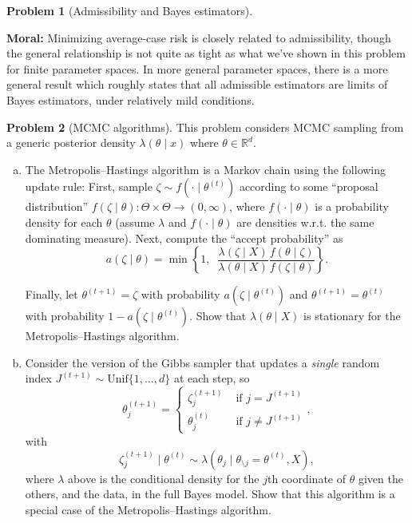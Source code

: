 \documentclass{article}
\newcommand{\RR}{\mathbb{R}}
\theoremstyle{definition}
\newtheorem{problem}{Problem}
\begin{document}
\begin{problem}[Admissibility and Bayes estimators]
\begin{enumerate}[(a)]
\end{enumerate}

{\bf Moral:} Minimizing average-case risk is closely related to admissibility, though the general relationship is not quite as tight as what we've shown in this problem for finite parameter spaces. In more general parameter spaces, there is a more general result which roughly states that all admissible estimators are limits of Bayes estimators, under relatively mild conditions.
\end{problem}


\begin{problem}[MCMC algorithms]
This problem considers MCMC sampling from a generic posterior density $\lambda(\theta \mid x)$ where $\theta\in\RR^d$.

\begin{enumerate}[(a)]

\item The Metropolis--Hastings algorithm is a Markov chain using the following update rule: First, sample $\zeta \sim f(\cdot \mid \theta^{(t)})$ according to some ``proposal distribution'' $f(\zeta\mid\theta): \Theta \times \Theta \to (0,\infty)$, where $f(\cdot \mid \theta)$ is a probability density for each $\theta$ (assume $\lambda$ and $f(\cdot \mid \theta)$ are densities w.r.t. the same dominating measure). Next, compute the ``accept probability'' as 
\[
a(\zeta \mid \theta) = \min \left\{1, \;\;\frac{\lambda(\zeta \mid X)}{\lambda(\theta \mid X) } \frac{f(\theta \mid \zeta)}{f(\zeta \mid \theta)}\right\}.
\]

Finally, let $\theta^{(t+1)} = \zeta$ with probability $a(\zeta \mid \theta^{(t)})$ and $\theta^{(t+1)} = \theta^{(t)}$ with probability $1-a(\zeta \mid \theta^{(t)})$. Show that $\lambda(\theta\mid X)$ is stationary for the Metropolis--Hastings algorithm.




\item Consider the version of the Gibbs sampler that updates a {\em single} random index $J^{(t+1)} \sim \text{Unif}\{1,\ldots,d\}$ at each step, so
\[
\theta_j^{(t+1)} = \begin{cases} \zeta_j^{(t+1)} &\text{ if } j = J^{(t+1)} \\ \theta_j^{(t)} &\text{ if } j \neq J^{(t+1)}\end{cases},
\]
with
\[
\zeta_j^{(t+1)} \mid \theta^{(t)} \sim \lambda(\theta_j \mid \theta_{\setminus j} = \theta^{(t)}, X),
\]
where $\lambda$ above is the conditional density for the $j$th coordinate of  $\theta$ given the others, and the data, in the full Bayes model. Show that this algorithm is a special case of the Metropolis--Hastings algorithm.






\end{enumerate}
\end{problem}
\end{document}
